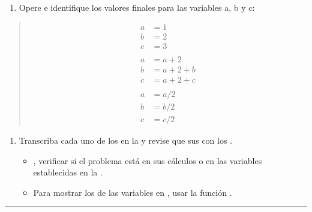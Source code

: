 \documentclass[letterpaper,10pt,spanish]{sphinxmanual}
\begin{document}
\begin{enumerate}
%
\setcounter{enumi}{8}
\item {} 
\sphinxAtStartPar
Opere e identifique los valores finales para las variables a, b y c:

\end{enumerate}
\begin{quote}
\begin{equation*}
\begin{split}a &= 1
\\ b &= 2
\\ c &= 3
\\
\\ a &= a + 2
\\ b &= a + 2 + b
\\ c &= a + 2 + c
\\
\\ a &= a / 2
\\ b &= b / 2
\\ c &= c / 2\end{split}
\end{equation*}\end{quote}
\begin{enumerate}
%
\setcounter{enumi}{9}
\item {} 
\sphinxAtStartPar
Transcriba cada uno de los  en la  y revise que sus   con los .
\begin{itemize}
\item {} 
\sphinxAtStartPar
{}, verificar si el problema está en sus cálculos o en las variables establecidas en la .

\item {} 
\sphinxAtStartPar
Para mostrar los  de las variables en , usar la función .

\end{itemize}

\end{enumerate}


\bigskip\hrule\bigskip
\end{document}
